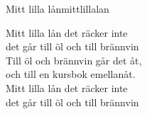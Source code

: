 \begin{song}{Mitt lilla lån}{mittlillalan}
\begin{vers}
\repopen Mitt lilla lån det räcker inte\\
det går till öl och till brännvin \repclose\\
Till öl och brännvin går det åt,\\
och till en kursbok emellanåt.\\
Mitt lilla lån det räcker inte\\
det går till öl och till brännvin\\
\end{vers}
\end{song}
